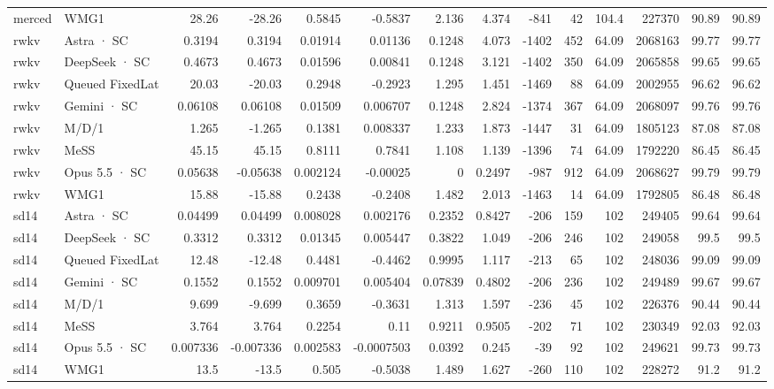 \begin{tabular}{llrrrrrrrrrrrr}
merced & WMG1 & 28.26 & -28.26 & 0.5845 & -0.5837 & 2.136 & 4.374 & -841 & 42 & 104.4 & 227370 & 90.89 & 90.89 \\
rwkv & Astra · SC & 0.3194 & 0.3194 & 0.01914 & 0.01136 & 0.1248 & 4.073 & -1402 & 452 & 64.09 & 2068163 & 99.77 & 99.77 \\
rwkv & DeepSeek · SC & 0.4673 & 0.4673 & 0.01596 & 0.00841 & 0.1248 & 3.121 & -1402 & 350 & 64.09 & 2065858 & 99.65 & 99.65 \\
rwkv & Queued FixedLat & 20.03 & -20.03 & 0.2948 & -0.2923 & 1.295 & 1.451 & -1469 & 88 & 64.09 & 2002955 & 96.62 & 96.62 \\
rwkv & Gemini · SC & 0.06108 & 0.06108 & 0.01509 & 0.006707 & 0.1248 & 2.824 & -1374 & 367 & 64.09 & 2068097 & 99.76 & 99.76 \\
rwkv & M/D/1 & 1.265 & -1.265 & 0.1381 & 0.008337 & 1.233 & 1.873 & -1447 & 31 & 64.09 & 1805123 & 87.08 & 87.08 \\
rwkv & MeSS & 45.15 & 45.15 & 0.8111 & 0.7841 & 1.108 & 1.139 & -1396 & 74 & 64.09 & 1792220 & 86.45 & 86.45 \\
rwkv & Opus 5.5 · SC & 0.05638 & -0.05638 & 0.002124 & -0.00025 & 0 & 0.2497 & -987 & 912 & 64.09 & 2068627 & 99.79 & 99.79 \\
rwkv & WMG1 & 15.88 & -15.88 & 0.2438 & -0.2408 & 1.482 & 2.013 & -1463 & 14 & 64.09 & 1792805 & 86.48 & 86.48 \\
sd14 & Astra · SC & 0.04499 & 0.04499 & 0.008028 & 0.002176 & 0.2352 & 0.8427 & -206 & 159 & 102 & 249405 & 99.64 & 99.64 \\
sd14 & DeepSeek · SC & 0.3312 & 0.3312 & 0.01345 & 0.005447 & 0.3822 & 1.049 & -206 & 246 & 102 & 249058 & 99.5 & 99.5 \\
sd14 & Queued FixedLat & 12.48 & -12.48 & 0.4481 & -0.4462 & 0.9995 & 1.117 & -213 & 65 & 102 & 248036 & 99.09 & 99.09 \\
sd14 & Gemini · SC & 0.1552 & 0.1552 & 0.009701 & 0.005404 & 0.07839 & 0.4802 & -206 & 236 & 102 & 249489 & 99.67 & 99.67 \\
sd14 & M/D/1 & 9.699 & -9.699 & 0.3659 & -0.3631 & 1.313 & 1.597 & -236 & 45 & 102 & 226376 & 90.44 & 90.44 \\
sd14 & MeSS & 3.764 & 3.764 & 0.2254 & 0.11 & 0.9211 & 0.9505 & -202 & 71 & 102 & 230349 & 92.03 & 92.03 \\
sd14 & Opus 5.5 · SC & 0.007336 & -0.007336 & 0.002583 & -0.0007503 & 0.0392 & 0.245 & -39 & 92 & 102 & 249621 & 99.73 & 99.73 \\
sd14 & WMG1 & 13.5 & -13.5 & 0.505 & -0.5038 & 1.489 & 1.627 & -260 & 110 & 102 & 228272 & 91.2 & 91.2 \\

\end{tabular}
